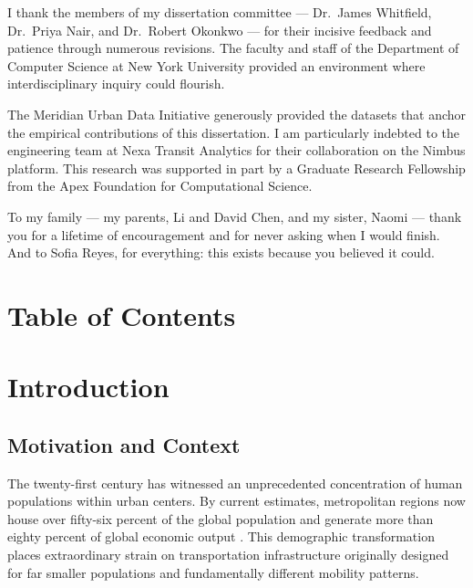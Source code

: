 \documentclass[12pt,letterpaper,twoside]{report}
\begin{document}
I thank the members of my dissertation committee --- Dr.\ James Whitfield, Dr.\ Priya Nair, and Dr.\ Robert Okonkwo --- for their incisive feedback and patience through numerous revisions. The faculty and staff of the Department of Computer Science at New York University provided an environment where interdisciplinary inquiry could flourish.

The Meridian Urban Data Initiative generously provided the datasets that anchor the empirical contributions of this dissertation. I am particularly indebted to the engineering team at Nexa Transit Analytics for their collaboration on the Nimbus platform. This research was supported in part by a Graduate Research Fellowship from the Apex Foundation for Computational Science.

To my family --- my parents, Li and David Chen, and my sister, Naomi --- thank you for a lifetime of encouragement and for never asking when I would finish. And to Sofia Reyes, for everything: this exists because you believed it could.

\doublespacing

\chapter*{Table of Contents}
\thispagestyle{plain}
\singlespacing
\tableofcontents

\clearpage
{}
\pagestyle{thesis}

\chapter{Introduction}

\section{Motivation and Context}

The twenty-first century has witnessed an unprecedented concentration of human populations within urban centers. By current estimates, metropolitan regions now house over fifty-six percent of the global population and generate more than eighty percent of global economic output \cite{chen2023urban}. This demographic transformation places extraordinary strain on transportation infrastructure originally designed for far smaller populations and fundamentally different mobility patterns.
\end{document}
